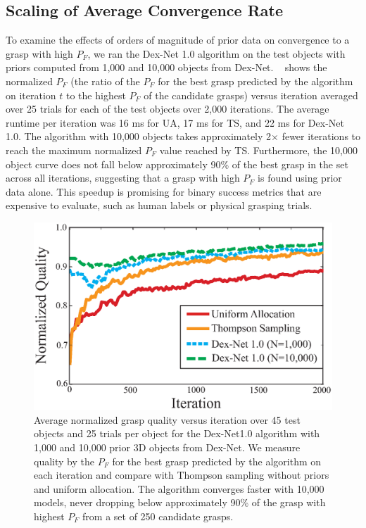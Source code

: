 \subsection{Scaling of Average Convergence Rate}
To examine the effects of orders of magnitude of prior data on convergence to a grasp with high $P_F$, we ran the Dex-Net 1.0 algorithm on the test objects with priors computed from 1,000 and 10,000 objects from Dex-Net. 
~ shows the normalized $P_F$  (the ratio of the $P_F$ for the best grasp predicted by the algorithm on iteration $t$ to the highest $P_F$ of the candidate grasps) versus iteration averaged over 25 trials for each of the test objects over 2,000 iterations.
The average runtime per iteration was 16 ms for UA, 17 ms for TS, and 22 ms for Dex-Net 1.0.
The algorithm with 10,000 objects takes approximately 2$\times$ fewer iterations to reach the maximum normalized $P_F$ value reached by TS.
Furthermore, the 10,000 object curve does not fall below approximately 90\% of the best grasp in the set across all iterations, suggesting that a grasp with high $P_F$ is found using prior data alone.
This speedup is promising for binary success metrics that are expensive to  evaluate, such as human labels or physical grasping trials.

\begin{figure}[t!]
\centering
\includegraphics[scale=0.40]{figures/illustrations/avg_reward.eps}
\caption{Average normalized grasp quality versus iteration over 45 test objects and 25 trials per object for the Dex-Net1.0 algorithm with 1,000 and 10,000 prior 3D objects from Dex-Net. We measure quality by the $P_F$ for the best grasp predicted by the algorithm on each iteration and compare with Thompson sampling without priors and uniform allocation. The algorithm converges faster with 10,000 models, never dropping below approximately 90\% of the grasp with highest $P_F$ from a set of 250 candidate grasps.}
\vspace*{-10pt}
\end{figure}

